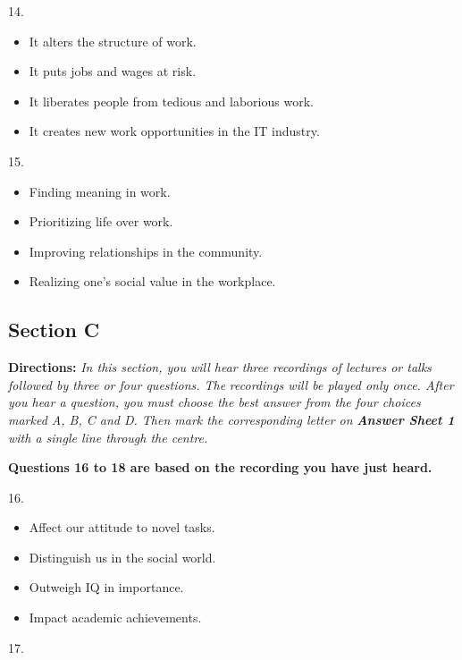 \documentclass[UTF8,11pt]{ctexart}
\begin{document}
14.


\begin{itemize}[leftmargin=2em,itemsep=.2em,topsep=.4em]\item[A.] It alters the structure of work.
\item[B.] It puts jobs and wages at risk.
\item[C.] It liberates people from tedious and laborious work.
\item[D.] It creates new work opportunities in the IT industry.
\end{itemize}

15.


\begin{itemize}[leftmargin=2em,itemsep=.2em,topsep=.4em]\item[A.] Finding meaning in work.
\item[B.] Prioritizing life over work.
\item[C.] Improving relationships in the community.
\item[D.] Realizing one’s social value in the workplace.
\end{itemize}

\subsection*{\textbf{Section C}}


\textbf{Directions:}\textit{ In this section, you will hear three recordings of lectures or talks followed by three or four questions. The} \textit{recordings will be played only once. After you hear a question, you must choose the best answer from the four choices} \textit{marked A, B, C and D. Then mark the corresponding letter on }\textbf{\textit{Answer Sheet 1}}\textit{ with a single line through the centre.}


\textbf{Questions 16 to 18 are based on the recording you have just heard.}


16.


\begin{itemize}[leftmargin=2em,itemsep=.2em,topsep=.4em]\item[A.] Affect our attitude to novel tasks.
\item[B.] Distinguish us in the social world.
\item[C.] Outweigh IQ in importance.
\item[D.] Impact academic achievements.
\end{itemize}

17.
\end{document}
